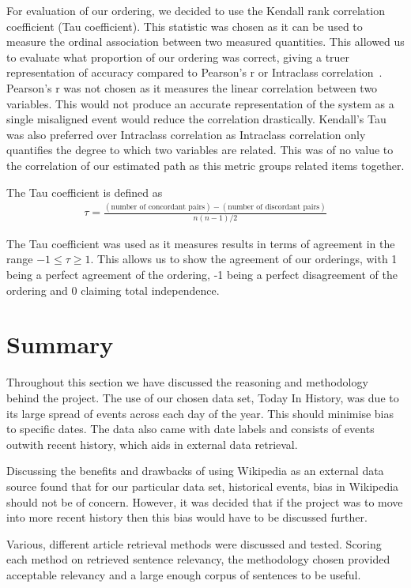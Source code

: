 \documentclass[bsc,frontabs,twoside,singlespacing,parskip,deptreport]{infthesis}     %
\begin{document}
For evaluation of our ordering, we decided to use the Kendall rank correlation coefficient (Tau coefficient).
This statistic was chosen as it can be used to measure the ordinal association between two measured quantities.
This allowed us to evaluate what proportion of our ordering was correct, giving a truer representation of accuracy
compared to Pearson's r or Intraclass correlation~\cite{chok2010pearson}.
Pearson's r was not chosen as it measures the linear correlation between two variables.
This would not produce an accurate representation of the system as a single misaligned event would reduce the
correlation drastically.
Kendall's Tau was also preferred over Intraclass correlation as Intraclass correlation only quantifies the
degree to which two variables are related. This was of no value to the correlation of our estimated path
as this metric groups related items together.


The Tau coefficient is defined as
\begin{eqnarray}
  \tau=\frac{(\text{number of concordant pairs})-(\text{number of discordant pairs})}{n(n-1)/2}\nonumber
\end{eqnarray}\cite{abdi2007kendall}

The Tau coefficient was used as it measures results in terms of agreement in the range $-1 \leq \tau \geq 1$.
This allows us to show the agreement of our orderings, with 1 being a perfect agreement of the ordering, -1 being a perfect disagreement of the ordering and 0 claiming
total independence.


\section{Summary}
Throughout this section we have discussed the reasoning and methodology behind the project.
The use of our chosen data set, Today In History, was due to its large spread of events across
each day of the year. This should minimise bias to specific dates. The data also came with date labels and
consists of events outwith recent history, which aids in external data retrieval.

Discussing the benefits and drawbacks of using Wikipedia as an external data source found that
for our particular data set, historical events, bias in Wikipedia should not be of concern.
However, it was decided that if the project was to move into more recent history then this bias would
have to be discussed further.

Various, different article retrieval methods were discussed and tested.
Scoring each method on retrieved sentence relevancy, the methodology chosen provided acceptable relevancy
and a large enough corpus of sentences to be useful.
\end{document}
